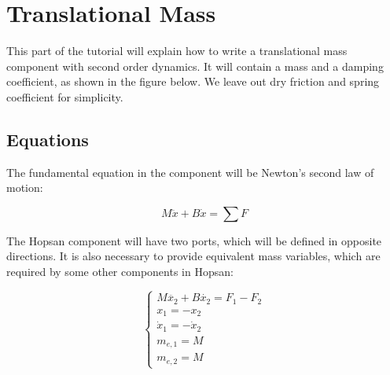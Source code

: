 \documentclass[a4paper,pdftex]{article}
\begin{document}
\vfill

\section*{Translational Mass}
This part of the tutorial will explain how to write a translational mass component with second order dynamics. It will contain a mass and a damping coefficient, as shown in the figure below. We leave out dry friction and spring coefficient for simplicity.


\subsection*{Equations}

The fundamental equation in the component will be Newton's second law of motion:

\begin{equation*}
M\ddot{x} + B\dot{x} = \sum{F}
\end{equation*}

\noindent The Hopsan component will have two ports, which will be defined in opposite directions. It is also necessary to provide equivalent mass variables, which are required by some other components in Hopsan:

\begin{equation*}
\begin{cases}
M\ddot{x_{2}} + B\dot{x_{2}} = F_{1} - F_{2}\\
x_{1} = -x_{2} \\
\dot{x}_{1} = -\dot{x}_{2} \\
m_{e,1} = M \\
m_{e,2} = M
\end{cases}
\end{equation*}
\end{document}
